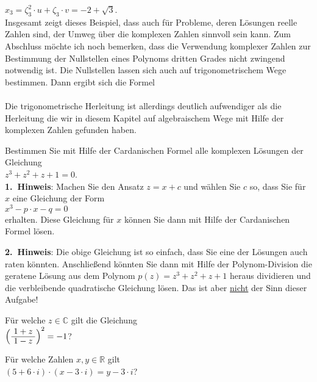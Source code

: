 $x_3 = \zeta_3^2 \cdot u + \zeta_3 \cdot v = -2 + \sqrt{3}$.
\\[0.2cm]
Insgesamt zeigt dieses Beispiel, dass auch für Probleme, deren Lösungen reelle Zahlen sind, der Umweg
über die komplexen Zahlen sinnvoll sein kann.  Zum Abschluss möchte ich noch bemerken, dass die
Verwendung komplexer Zahlen zur Bestimmung der Nullstellen eines Polynoms dritten Grades nicht
zwingend notwendig ist.  Die Nullstellen lassen sich auch auf trigonometrischem Wege bestimmen.  Dann ergibt
sich die Formel 
\\[0.2cm]
\hspace*{1.3cm}
\\[0.2cm]
Die trigonometrische Herleitung ist allerdings deutlich aufwendiger als die Herleitung die wir in diesem
Kapitel auf algebraischem Wege mit Hilfe der komplexen Zahlen gefunden haben.

\exercise
Bestimmen Sie mit Hilfe der Cardanischen Formel alle komplexen Lösungen der Gleichung
\\[0.2cm]
\hspace*{1.3cm}
$z^3 + z^2 + z + 1 = 0$.
\\[0.2cm]
\textbf{1.~Hinweis}:  Machen Sie den Ansatz $z = x + c$ und wählen Sie $c$ so, dass Sie für $x$ eine
Gleichung der Form
\\[0.2cm]
\hspace*{1.3cm}
$x^3 - p \cdot x - q = 0$
\\[0.2cm]
erhalten.  Diese Gleichung für $x$ können Sie dann mit Hilfe der Cardanischen Formel lösen.

\noindent
\textbf{2.~Hinweis}:  Die obige Gleichung ist so einfach, dass Sie eine der Lösungen auch 
raten könnten.  Anschließend könnten Sie dann mit Hilfe der Polynom-Division die geratene Lösung aus
dem Polynom $p(z) = z^3 + z^2 + z + 1$ heraus dividieren und die verbleibende quadratische Gleichung
lösen.  Das ist aber \underline{nicht} der Sinn dieser Aufgabe!
\exend

\exercise
Für welche $z \in \mathbb{C}$ gilt die Gleichung
\\[0.2cm]
\hspace*{1.3cm}
$\left(\bruch{1+z}{1-z}\right)^2 = -1$?
\exend
\pagebreak

\exercise
Für welche Zahlen $x, y \in \mathbb{R}$ gilt
\\[0.2cm]
\hspace*{1.3cm}
$(5 + 6 \cdot i) \cdot (x - 3 \cdot i) = y - 3 \cdot i$?
\exend

